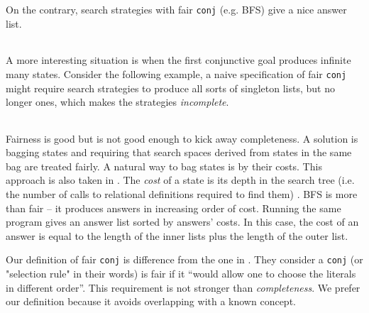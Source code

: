\documentclass[format=acmlarge, review=true, authordraft=true]{acmart}
\newcommand{\conj}{\texttt{conj}}
\begin{document}
\begin{center}
	\begin{tabular}{c}
		
	\end{tabular}
\end{center}

On the contrary, search strategies with fair \conj{} (e.g. BFS) give a nice 
answer list.

\begin{center}
	\begin{tabular}{c}
		
	\end{tabular}
\end{center}

A more interesting situation is when the first conjunctive goal produces 
infinite many states. Consider the following example, a naive specification of 
fair \conj{} might require search strategies to produce all sorts of singleton 
lists, but no longer ones, which makes the strategies \emph{incomplete}. 

\begin{center}
	\begin{tabular}{c}
		
	\end{tabular}
\end{center}

Fairness is good but is not good enough to kick away completeness. A solution  
is bagging states and requiring that 
search spaces derived from states in the same bag are treated fairly. A natural 
way to bag states is by their costs.
This approach is also taken in \citep{seres1999algebra}.
The \emph{cost} of a state is its depth in 
the search tree (i.e. the number of calls to relational definitions required to 
find them) \citep{seres1999algebra}. BFS is more than fair -- it produces 
answers in increasing order of cost. Running the same program gives an answer 
list sorted by answers' costs. In this case, the cost of an answer is equal to 
the length of the inner lists plus the length of the outer list.

Our definition of fair \conj{} is difference from the one in 
\citep{seres1999algebra}. They consider a \conj{} (or "selection rule" in their 
words) is fair if it ``would allow one to choose the literals in different 
order''\citep{seres1999algebra}. This requirement is not stronger than 
\emph{completeness}. We prefer our definition because it avoids overlapping 
with a known concept.
\end{document}
